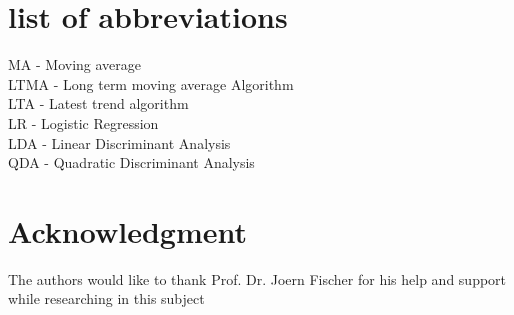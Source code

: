 \documentclass[conference]{IEEEtran}
\begin{document}
%


\appendix
\section*{list of abbreviations}
MA - Moving average
\\
LTMA - Long term moving average Algorithm
\\
LTA - Latest trend algorithm
\\
LR - Logistic Regression
\\
LDA - Linear Discriminant Analysis
\\
QDA - Quadratic Discriminant Analysis


\listoffigures
\section*{Acknowledgment}

The authors would like to thank Prof. Dr. Joern Fischer for his help and support while researching in this subject




\ifCLASSOPTIONcaptionsoff
  \newpage
\fi




\end{document}
